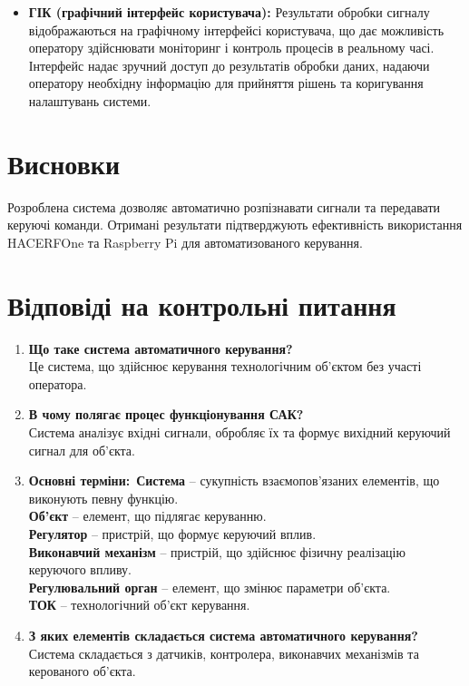 \documentclass[a4paper]{article}
\begin{document}
\begin{itemize}
    \item \textbf{ГІК (графічний інтерфейс користувача):} 
    Результати обробки сигналу відображаються на графічному інтерфейсі користувача, що дає можливість оператору здійснювати моніторинг і контроль процесів в реальному часі. Інтерфейс надає зручний доступ до результатів обробки даних, надаючи оператору необхідну інформацію для прийняття рішень та коригування налаштувань системи.
\end{itemize}


\section*{Висновки}
Розроблена система дозволяє автоматично розпізнавати сигнали та передавати керуючі команди. Отримані результати підтверджують ефективність використання HACERFOne та Raspberry Pi для автоматизованого керування.

\section*{Відповіді на контрольні питання}
\begin{enumerate}
    \item \textbf{Що таке система автоматичного керування?}\\
    Це система, що здійснює керування технологічним об'єктом без участі оператора.
    \item \textbf{В чому полягає процес функціонування САК?}\\
    Система аналізує вхідні сигнали, обробляє їх та формує вихідний керуючий сигнал для об'єкта.
    \item \textbf{Основні терміни:}\
    \textbf{Система} – сукупність взаємопов'язаних елементів, що виконують певну функцію.\\
    \textbf{Об’єкт} – елемент, що підлягає керуванню.\\
    \textbf{Регулятор} – пристрій, що формує керуючий вплив.\\
    \textbf{Виконавчий механізм} – пристрій, що здійснює фізичну реалізацію керуючого впливу.\\
    \textbf{Регулювальний орган} – елемент, що змінює параметри об'єкта.\\
    \textbf{ТОК} – технологічний об'єкт керування.
    \item \textbf{З яких елементів складається система автоматичного керування?}\\
    Система складається з датчиків, контролера, виконавчих механізмів та керованого об'єкта.
\end{enumerate}
\end{document}
